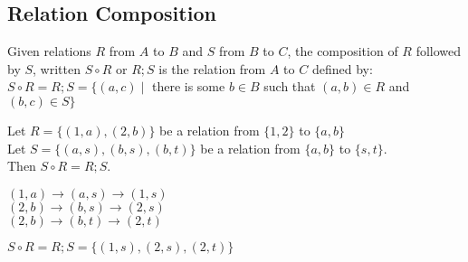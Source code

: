 \documentclass[../notes.tex]{subfiles}
\begin{document}
			\subsection{Relation Composition}
				Given relations $R$ from $A$ to $B$ and $S$ from $B$ to $C$, the composition of $R$ followed by $S$, written $S \circ R$ or $R;S$ is the relation from $A$ to $C$ defined by:\\
				$S \circ R = R;S = \bigl\{(a, c) \mid$ there is some $b \in B$ such that $(a, b) \in R$ and $(b, c) \in S\bigr\}$
				\begin{example}
					Let $R = \bigl\{(1, a), (2, b)\bigr\}$ be a relation from $\{1, 2\}$ to $\{a, b\}$\\
					Let $S = \bigl\{(a, s), (b, s), (b, t)\bigr\}$ be a relation from $\{a, b\}$ to $\{s, t\}$.\\
					Then $S \circ R = R;S$.
					\begin{adjustwidth}{1cm}{}
						$(1, a) \rightarrow (a, s) \rightarrow (1, s)$\\
						$(2, b) \rightarrow (b, s) \rightarrow (2, s)$\\
						$(2, b) \rightarrow (b, t) \rightarrow (2, t)$
					\end{adjustwidth}
					$S \circ R = R;S = \bigl\{(1, s), (2, s), (2, t)\bigr\}$
				\end{example}
				\pagebreak
\end{document}
